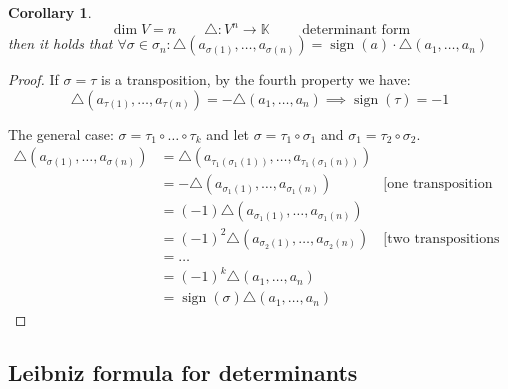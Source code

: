 \documentclass{article}
\newcounter{lecref}[section]
\numberwithin{lecref}{section}
\newtheorem{corollary}[lecref]{Corollary}
\DeclareMathOperator{\sign}{sign}
\begin{document}
\begin{corollary} %
  \label{cor:719}
  \[ \dim V = n \qquad \triangle: V^n \to \mathbb K \qquad \text{ determinant form} \]
  then it holds that $\forall \sigma \in \sigma_n: \triangle(a_{\sigma(1)}, \dots, a_{\sigma(n)}) = \sign(a) \cdot \triangle(a_1, \dots, a_n)$
\end{corollary}

\begin{proof}
  If $\sigma = \tau$ is a transposition, by the fourth property we have:
  \[ \triangle(a_{\tau(1)}, \dots, a_{\tau(n)}) = -\triangle(a_1, \dots, a_n) \implies \sign(\tau) = -1 \]

  The general case: $\sigma = \tau_1 \circ \dots \circ \tau_k$ and let $\sigma = \tau_1 \circ \sigma_1$ and $\sigma_1 = \tau_2 \circ \sigma_2$.
  \begin{align*}
    \triangle(a_{\sigma(1)}, \dots, a_{\sigma(n)}) &= \triangle(a_{\tau_1(\sigma_1(1))}, \dots, a_{\tau_1(\sigma_1(n))}) \\
      &= -\triangle(a_{\sigma_1(1)}, \dots, a_{\sigma_1(n)}) & \text{[one transposition applied]} \\
      &= (-1) \triangle(a_{\sigma_1(1)}, \dots, a_{\sigma_1(n)}) \\
      &= (-1)^2 \triangle(a_{\sigma_2(1)}, \dots, a_{\sigma_2(n)}) & \text{[two transpositions applied]} \\
      &= \dots \\
      &= (-1)^k \triangle (a_1, \dots, a_n) \\
      &= \sign(\sigma) \triangle(a_1, \dots, a_n)
  \end{align*}
\end{proof}

\subsection{Leibniz formula for determinants}
\end{document}
